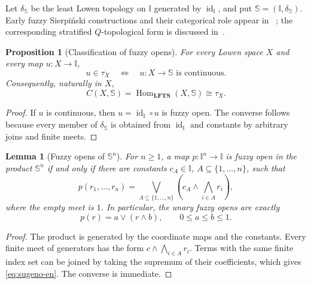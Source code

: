 \documentclass[10pt,a4paper]{amsart}
\numberwithin{equation}{section}
\newtheorem{proposition}[theorem]{Proposition}
\newtheorem{lemma}[theorem]{Lemma}
\newcommand{\I}{\mathbb I}
\newcommand{\Sier}{\mathbb S}
\newcommand{\LFTS}{\mathbf{LFTS}}
\newcommand{\Hom}{\operatorname{Hom}}
\newcommand{\id}{\operatorname{id}}
\begin{document}
Let \(\delta_{\Sier}\) be the least Lowen topology on \(\I\) generated
by \(\id_{\I}\), and put \(\Sier=(\I,\delta_{\Sier})\).  Early fuzzy
Sierpiński constructions and their categorical role appear in
~\cite{Srivastava1984-en,SrivastavaSrivastava1986-en,
LowenSrivastava1988-en}; the corresponding stratified \(Q\)-topological
form is discussed in~\cite{TiwariSrivastava2022-en}.

\begin{proposition}[Classification of fuzzy opens]\label{prop:class-en}
For every Lowen space \(X\) and every map \(u:X\to\I\),
\[
 u\in\tau_X \quad\Longleftrightarrow\quad u:X\to\Sier
 \text{ is continuous}.
\]
Consequently, naturally in \(X\),
\begin{equation}\label{eq:hom-en}
 C(X,\Sier)=\Hom_{\LFTS}(X,\Sier)\cong\tau_X.
\end{equation}
\end{proposition}

\begin{proof}
If \(u\) is continuous, then \(u=\id_\I\circ u\) is fuzzy open.  The
converse follows because every member of \(\delta_{\Sier}\) is obtained
from \(\id_\I\) and constants by arbitrary joins and finite meets.
\end{proof}

\begin{lemma}[Fuzzy opens of \(\Sier^n\)]\label{lem:sier-n-en}
For \(n\geq1\), a map \(p:\I^n\to\I\) is fuzzy open in the product
\(\Sier^n\) if and only if there are constants
\(c_A\in\I\), \(A\subseteq\{1,\ldots,n\}\), such that
\begin{equation}\label{eq:sugeno-en}
 p(r_1,\ldots,r_n)=
 \bigvee_{A\subseteq\{1,\ldots,n\}}
 \left(c_A\wedge\bigwedge_{i\in A}r_i\right),
\end{equation}
where the empty meet is \(1\).  In particular, the unary fuzzy opens
are exactly
\begin{equation}\label{eq:clamp-en}
 p(r)=a\vee(r\wedge b),\qquad 0\leq a\leq b\leq1.
\end{equation}
\end{lemma}

\begin{proof}
The product is generated by the coordinate maps and the constants.
Every finite meet of generators has the form
\(c\wedge\bigwedge_{i\in A}r_i\).  Terms with the same finite index set
can be joined by taking the supremum of their coefficients, which gives
\eqref{eq:sugeno-en}.  The converse is immediate.
\end{proof}
\end{document}
